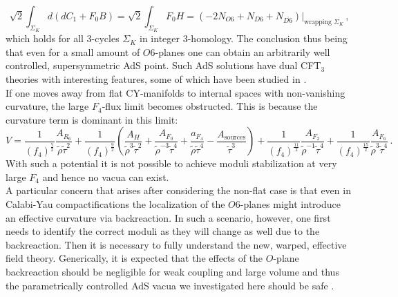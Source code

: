 \documentclass[a4paper,12pt,twoside,openright]{report}
\newcommand{\be}{\begin{equation}}
\newcommand{\ee}{\end{equation}}
\begin{document}
\be 
\sqrt{2} \int_{\Sigma_K} d \left(dC_1 + F_0 B\right) = \sqrt{2} \int_{\Sigma_K} F_0 H = (-2 N_{O6} + N_{D6} + N_{\overline{D6}})|_{\text{wrapping }\Sigma_K}\,,
\ee
which holds for all 3-cycles $\Sigma_K$ in integer 3-homology. The conclusion thus being that even for a small amount of $O6$-planes one can obtain an arbitrarily well controlled, supersymmetric AdS point. Such AdS solutions have dual CFT$_3$ theories with interesting features, some of which have been studied in \cite{Aharony:2008wz}.\\
If one moves away from flat CY-manifolds to internal spaces with non-vanishing curvature, the large $F_4$-flux limit becomes obstructed. This is because the curvature term is dominant in this limit:
\be 
V = \frac{1}{(f_4)^ {\frac{7}{2}}} \frac{A_{R_6}}{\tilde{\rho} \tilde{\tau}^ 2} +\frac{1}{(f_4)^ {\frac{9}{2}}} \left( \frac{A_H}{\tilde{\rho}^3 \tilde{\tau}^ 2} + \frac{A_{F_0}}{\tilde{\rho}^ {-3}\tilde{\tau}^ 4} + \frac{a_{F_4}}{\tilde{\rho}\tilde{\tau}^ 4} - \frac{A_{\text{sources}}}{\tilde{\tau}^ 3} \right) + \frac{1}{(f_4)^ {\frac{11}{2}}} \frac{A_{F_2}}{\tilde{\rho}^ {-1}\tilde{\tau}^ 4} + \frac{1}{(f_4)^ {\frac{15}{2}}} \frac{A_{F_6}}{\tilde{\rho}^3\tilde{\tau}^ 4}\,.
\ee
With such a potential it is not possible to achieve moduli stabilization at very large $F_4$ and hence no vacua can exist.\\
A particular concern that arises after considering the non-flat case is that even in Calabi-Yau compactifications the localization of the $O6$-planes might introduce an effective curvature via backreaction. In such a scenario, however, one first needs to identify the correct moduli as they will change as well due to the backreaction. Then it is necessary to fully understand the new, warped, effective field theory. Generically, it is expected that the effects of the $O$-plane backreaction should be negligible for weak coupling and large volume and thus the parametrically controlled AdS vacua we investigated here should be safe \cite{Acharya:2006ne,Saracco:2012wc,Gautason:2015tig,Junghans:2020acz}. 
\end{document}
